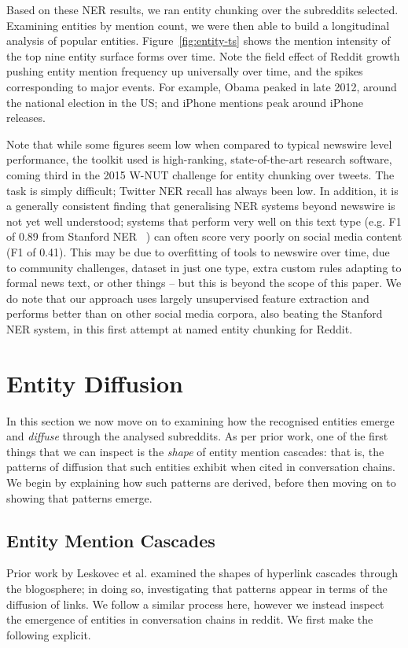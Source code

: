 \documentclass[journal,10pt,draftclsnofoot,onecolumn]{IEEEtran}
\begin{document}
Based on these NER results, we ran entity chunking over the subreddits selected.
Examining entities by mention count, we were then able to build a longitudinal analysis of popular entities.
Figure~\ref{fig:entity-ts} shows the mention intensity of the top nine entity surface forms over time.
Note the field effect of Reddit growth pushing entity mention frequency up universally over time, and the spikes corresponding to major events.
For example, Obama peaked in late 2012, around the national election in the US; and iPhone mentions peak around iPhone releases.

Note that while some figures seem low when compared to typical newswire level performance, the toolkit used is high-ranking, state-of-the-art research software, coming third in the 2015 W-NUT challenge for entity chunking over tweets.
The task is simply difficult; Twitter NER recall has always been low.
In addition, it is a generally consistent finding that generalising NER systems beyond newswire is not yet well understood; systems that perform very well on this text type (e.g. F1 of 0.89 from Stanford NER~\cite{derczynski2015analysis}%
) can often score very poorly on social media content (F1 of 0.41).
This may be due to overfitting of tools to newswire over time, due to community challenges, dataset in just one type, extra custom rules adapting to formal news text, or other things -- but this is beyond the scope of this paper.
We do note that our approach uses largely unsupervised feature extraction and performs better than on other social media corpora, also beating the Stanford NER system, in this first attempt at named entity chunking for Reddit.


\clearpage
\section{Entity Diffusion}
In this section we now move on to examining how the recognised entities emerge and \emph{diffuse} through the analysed subreddits.
As per prior work, one of the first things that we can inspect is the \emph{shape} of entity mention cascades: that is, the patterns of diffusion that such entities exhibit when cited in conversation chains. 
We begin by explaining how such patterns are derived, before then moving on to showing that patterns emerge.

\subsection{Entity Mention Cascades}
Prior work by Leskovec et al. \cite{leskovec2007patterns} examined the shapes of hyperlink cascades through the blogosphere; in doing so, investigating that patterns appear in terms of the diffusion of links.
We follow a similar process here, however we instead inspect the emergence of entities in conversation chains in reddit.
We first make the following explicit.
\end{document}
